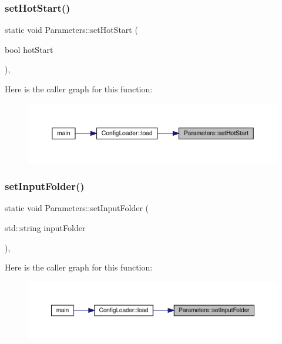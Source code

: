 \subsubsection{\texorpdfstring{setHotStart()}{setHotStart()}}
{\footnotesize\ttfamily static void Parameters\+::set\+Hot\+Start (\begin{DoxyParamCaption}\item[{bool}]{hot\+Start }\end{DoxyParamCaption})\hspace{0.3cm}{\ttfamily [inline]}, {\ttfamily [static]}}

Here is the caller graph for this function\+:\nopagebreak
\begin{figure}[H]
\begin{center}
\leavevmode
\includegraphics[width=350pt]{class_parameters_af4a107cdc7b6400685fdcbd33983a16f_icgraph}
\end{center}
\end{figure}
\mbox{\label{class_parameters_a64572c0531cc65e5d1c0fc4c8295a572}} 
\subsubsection{\texorpdfstring{setInputFolder()}{setInputFolder()}}
{\footnotesize\ttfamily static void Parameters\+::set\+Input\+Folder (\begin{DoxyParamCaption}\item[{std\+::string}]{input\+Folder }\end{DoxyParamCaption})\hspace{0.3cm}{\ttfamily [inline]}, {\ttfamily [static]}}

Here is the caller graph for this function\+:\nopagebreak
\begin{figure}[H]
\begin{center}
\leavevmode
\includegraphics[width=350pt]{class_parameters_a64572c0531cc65e5d1c0fc4c8295a572_icgraph}
\end{center}
\end{figure}
\mbox{\label{class_parameters_a5ed3d5d9a08ceecbd3378da54e717794}} 
